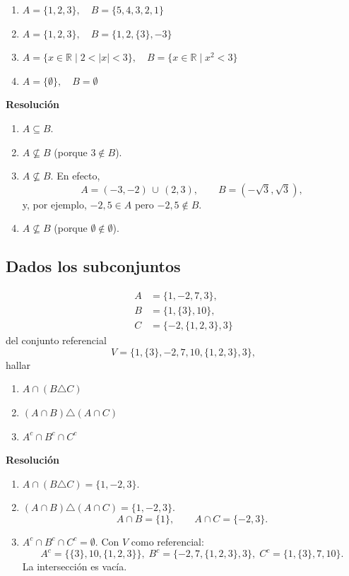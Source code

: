 \documentclass[11pt]{article}
\newcommand{\R}{\mathbb{R}}
\begin{document}
\begin{enumerate}[label=\roman*)]
    \item \(A = \{1,2,3\}, \quad B = \{5,4,3,2,1\}\)
    \item \(A = \{1,2,3\}, \quad B = \{1,2,\{3\},-3\}\)
    \item \(A = \{x \in \R \mid 2 < |x| < 3\}, \quad B = \{x \in \R \mid x^2 < 3\}\)
    \item \(A = \{\emptyset\}, \quad B = \emptyset\)
\end{enumerate}

\textbf{Resolución}
\begin{enumerate}[label=\roman*)]
    \item \(A \subseteq B\).
    \item \(A \not\subseteq B\) (porque \(3\notin B\)).
    \item \(A \not\subseteq B\). En efecto,
    \[
      A = (-3,-2)\,\cup\,(2,3),\qquad
      B = (-\sqrt{3}, \sqrt{3}),
    \]
    y, por ejemplo, \(-2{,}5 \in A\) pero \(-2{,}5 \notin B\).
    \item \(A \not\subseteq B\) (porque \(\emptyset\notin \emptyset\)).
\end{enumerate}

\subsection{Dados los subconjuntos}
\begin{align*}
A &= \{1,-2,7,3\}, \\
B &= \{1,\{3\},10\}, \\
C &= \{-2,\{1,2,3\},3\}
\end{align*}
del conjunto referencial
\[
V = \{1,\{3\},-2,7,10,\{1,2,3\},3\},
\]
hallar
\begin{enumerate}[label=\roman*)]
  \item \(A \cap (B \triangle C)\)
  \item \((A \cap B)\triangle (A \cap C)\)
  \item \(A^{c}\cap B^{c}\cap C^{c}\)
\end{enumerate}

\textbf{Resolución}
\begin{enumerate}[label=\roman*)]
    \item \(A \cap (B \triangle C) = \{1, -2, 3\}\).

    \item \((A \cap B) \triangle (A \cap C) = \{1, -2, 3\}\).
    \[
      A\cap B=\{1\},\qquad A\cap C=\{-2,3\}.
    \]

    \item \(A^{c} \cap B^{c} \cap C^{c} = \emptyset\). Con \(V\) como referencial:
    \[
      A^{c}=\{\{3\},10,\{1,2,3\}\},\;
      B^{c}=\{-2,7,\{1,2,3\},3\},\;
      C^{c}=\{1,\{3\},7,10\}.
    \]
    La intersección es vacía.
\end{enumerate}
\end{document}
